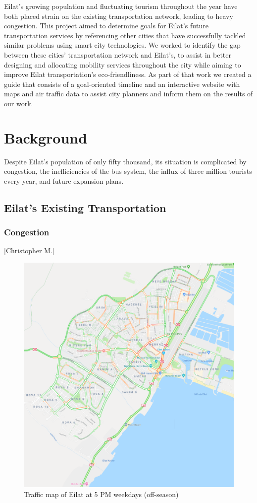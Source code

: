 \documentclass[12pt]{article}                               %
\begin{document}
Eilat's growing population and fluctuating tourism throughout the year have both placed strain on the existing transportation network, leading to heavy congestion. This project aimed to determine goals for Eilat's future transportation services by referencing other cities that have successfully tackled similar problems using smart city technologies. We worked to identify the gap between these cities' transportation network and Eilat's, to assist in better designing and allocating mobility services throughout the city while aiming to improve Eilat transportation's eco-friendliness. As part of that work we created a guide that consists of a goal-oriented timeline and an interactive website with maps and air traffic data to assist city planners and inform them on the results of our work.
 
\newpage
\section{Background}
Despite Eilat's population of only fifty thousand, its situation is complicated by congestion, the inefficiencies of the bus system, the influx of three million tourists every year, and future expansion plans.

\subsection{Eilat's Existing Transportation}
\subsubsection{Congestion}[Christopher M.]

\begin{figure}[H]
    \centering
    \includegraphics[width=0.8\columnwidth]{images/eilat_traffic.png}
    \caption{Traffic map of Eilat at 5 PM weekdays (off-season)}
    \label{img:eilatTraffic}
\end{figure}
\end{document}
